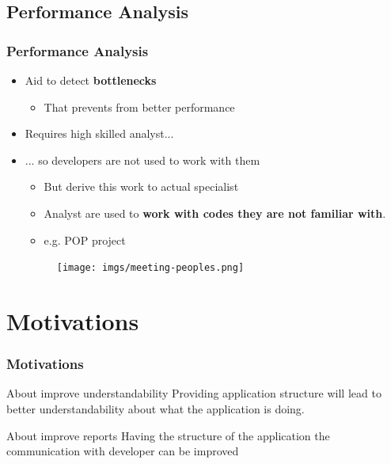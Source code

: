 \documentclass{beamer}
\begin{document}
\subsection{Performance Analysis}
\begin{frame}
\frametitle{Performance Analysis}
\begin{itemize}
	\item Aid to detect \textbf{bottlenecks}
	\begin{itemize}
		\item That prevents from better performance
	\end{itemize}
	\item Requires high skilled analyst...
	\item ... so developers are not used to work with them
	\begin{itemize}
		\item But derive this work to actual specialist
		\item Analyst are used to \textbf{work with codes they are not familiar with}.
		\item e.g. POP project
	\end{itemize}

	\begin{figure}
		\texttt{[image: imgs/meeting-peoples.png]}
	\end{figure}
\end{itemize}

%
\end{frame}

\section{Motivations}
\begin{frame}
\frametitle{Motivations}
\begin{block}{About improve understandability}
	Providing application structure will lead to better understandability about what the application is doing.
\end{block}
\pause
\begin{block}{About improve reports}
	Having the structure of the application the communication with developer can be improved
\end{block}
\end{frame}
\end{document}
